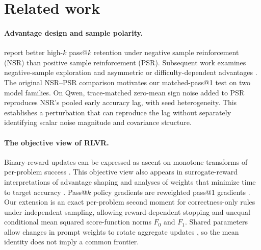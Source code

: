 \section{Related work}

\paragraph{Advantage design and sample polarity.}
\citet{zhu2025nsr} report better high-$k$ pass@$k$ retention under negative sample reinforcement (NSR) than positive sample reinforcement (PSR). Subsequent work examines negative-sample exploration \citep{tang2025polarity} and asymmetric or difficulty-dependent advantages \citep{ingle2026negative,yu2026symmetry,decugis2026fade}. The original NSR--PSR comparison motivates our matched-pass@1 test on two model families. On Qwen, trace-matched zero-mean sign noise added to PSR reproduces NSR's pooled early accuracy lag, with seed heterogeneity. This establishes a perturbation that can reproduce the lag without separately identifying scalar noise magnitude and covariance structure.

\paragraph{The objective view of RLVR.}
Binary-reward updates can be expressed as ascent on monotone transforms of per-problem success \citep{davis2025objective}. This objective view also appears in surrogate-reward interpretations of advantage shaping \citep{thrampoulidis2025shaping} and analyses of weights that minimize time to target accuracy \citep{heckel2026weighting}. Pass@$k$ policy gradients are reweighted pass@1 gradients \citep{yu2025diagnostic}. Our extension is an exact per-problem second moment for correctness-only rules under independent sampling, allowing reward-dependent stopping and unequal conditional mean squared score-function norms $F_0$ and $F_1$. Shared parameters allow changes in prompt weights to rotate aggregate updates \citep{barakat2026interference}, so the mean identity does not imply a common frontier.


